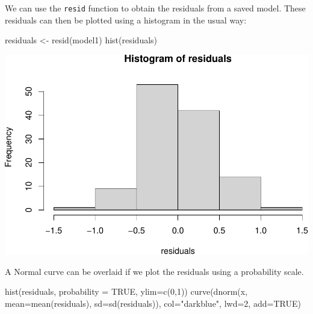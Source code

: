 \documentclass[
]{memoir}
\newenvironment{Shaded}{\begin{snugshade}}{\end{snugshade}}
\newcommand{\AttributeTok}[1]{\textcolor[rgb]{0.77,0.63,0.00}{#1}}
\newcommand{\ConstantTok}[1]{\textcolor[rgb]{0.00,0.00,0.00}{#1}}
\newcommand{\DecValTok}[1]{\textcolor[rgb]{0.00,0.00,0.81}{#1}}
\newcommand{\FunctionTok}[1]{\textcolor[rgb]{0.00,0.00,0.00}{#1}}
\newcommand{\NormalTok}[1]{#1}
\newcommand{\OtherTok}[1]{\textcolor[rgb]{0.56,0.35,0.01}{#1}}
\newcommand{\StringTok}[1]{\textcolor[rgb]{0.31,0.60,0.02}{#1}}
\begin{document}
We can use the \texttt{resid} function to obtain the residuals from a saved model. These residuals can then be plotted using a histogram in the usual way:

\begin{Shaded}
\begin{Highlighting}[]
\NormalTok{residuals }\OtherTok{\textless{}{-}} \FunctionTok{resid}\NormalTok{(model1)}
\FunctionTok{hist}\NormalTok{(residuals)}
\end{Highlighting}
\end{Shaded}

\includegraphics{08.1-correlation-regression-R_files/figure-latex/unnamed-chunk-10-1.pdf}

A Normal curve can be overlaid if we plot the residuals using a probability scale.

\begin{Shaded}
\begin{Highlighting}[]
\FunctionTok{hist}\NormalTok{(residuals, }\AttributeTok{probability =} \ConstantTok{TRUE}\NormalTok{, }\AttributeTok{ylim=}\FunctionTok{c}\NormalTok{(}\DecValTok{0}\NormalTok{,}\DecValTok{1}\NormalTok{))}
\FunctionTok{curve}\NormalTok{(}\FunctionTok{dnorm}\NormalTok{(x, }\AttributeTok{mean=}\FunctionTok{mean}\NormalTok{(residuals), }\AttributeTok{sd=}\FunctionTok{sd}\NormalTok{(residuals)), }
      \AttributeTok{col=}\StringTok{"darkblue"}\NormalTok{, }\AttributeTok{lwd=}\DecValTok{2}\NormalTok{, }\AttributeTok{add=}\ConstantTok{TRUE}\NormalTok{)}
\end{Highlighting}
\end{Shaded}
\end{document}
